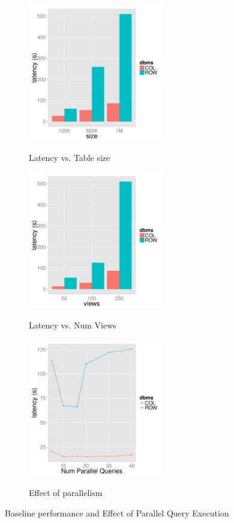 \begin{figure}[t]
	\centering
	\begin{subfigure}{0.33\linewidth}
		{\includegraphics[width=6cm] {Images/baselines_by_size.pdf}}
		\caption{Latency vs. Table size}
		\label{fig:baseline_size}
	\end{subfigure}
	\begin{subfigure}{0.33\linewidth}
		\centering
		{\includegraphics[width=6cm] {Images/baselines_by_views.pdf}}
		\caption{Latency vs. Num Views}
		\label{fig:baseline_views}
	\end{subfigure}
	\begin{subfigure}{0.33\linewidth}
		\centering
		{\includegraphics[width=6cm] {Images/parallel_noop.pdf}}
		\caption{Effect of parallelism}
		\label{fig:parallelism}
	\end{subfigure}
	\caption{Baseline performance and Effect of Parallel Query Execution}
	\label{fig:bank_perf}
\end{figure}

